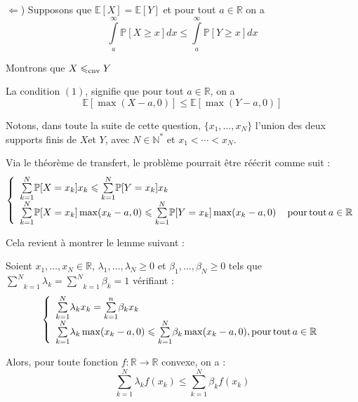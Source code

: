 $\Leftarrow$) Supposons que $\mathbb{E} [X] =\mathbb{E} [Y]$ et pour tout $a
\in \mathbb{R}$ on a
\begin{equation}
  \underset{a}{\overset{\infty}{\int}} \mathbb{P} [X \geqslant x] d x
  \leqslant \underset{a}{\overset{\infty}{\int}} \mathbb{P} [Y \geqslant x] d
  x
\end{equation}


Montrons que $X \leqslant_{\operatorname{cnv}} Y$

La condition $(1)$, signifie que pour tout $a \in \mathbb{R}$, on a
\[ \mathbb{E} [\max (X - a, 0)] \leqslant \mathbb{E} [\max (Y - a, 0)] \]


Notons, dans toute la suite de cette question, $\{ x_1, \ldots, x_N \}$
l'union des deux supports finis de $X$et $Y$, avec $N \in \mathbb{N}^{\ast}$
et $x_1 < \cdots < x_N$.

Via le th{\'e}or{\`e}me de transfert, le probl{\`e}me pourrait {\^e}tre
r{\'e}{\'e}crit comme suit :
\[ \left\{\begin{array}{l}
     \underset{k = 1}{\overset{N}{\sum}} \mathbb{P} [X = x_k] x_k \leqslant
     \underset{k = 1}{\overset{N}{\sum}} \mathbb{P} [Y = x_k] x_k\\
     \underset{k = 1}{\overset{N}{\sum}} \mathbb{P} [X = x_k] \max (x_k - a,
     0) \leqslant \underset{k = 1}{\overset{N}{\sum}} \mathbb{P} [Y = x_k]
     \max (x_k - a, 0) \quad \operatorname{pour} \operatorname{tout} a \in \mathbb{R}
   \end{array}\right. \]


Cela revient {\`a} montrer le lemme suivant :

 Soient $x_1, \ldots, x_N \in \mathbb{R}$, $\lambda_1,
\ldots, \lambda_N \geqslant 0$ et $\beta_1, \ldots, \beta_N \geqslant 0$ tels
que $\underset{k = 1}{\overset{N}{\sum}} \lambda_k = \underset{k =
1}{\overset{N}{\sum}} \beta_k = 1$ v{\'e}rifiant :
\begin{equation}
  \left\{\begin{array}{l}
    \underset{k = 1}{\overset{N}{\sum}} \lambda_k x_k = \underset{k =
    1}{\overset{n}{\sum}} \beta_k x_k\\
    \underset{k = 1}{\overset{N}{\sum}} \lambda_k \max (x_k - a, 0) \leqslant
    \underset{k = 1}{\overset{N}{\sum}} \beta_k \max (x_k - a, 0), \operatorname{pour}
    \operatorname{tout} a \in \mathbb{R}
  \end{array}\right.
\end{equation}


Alors, pour toute fonction $f : \mathbb{R} \rightarrow \mathbb{R}$ convexe, on
a :
\[ \underset{k = 1}{\overset{N}{\sum}} \lambda_k f (x_k) \leqslant \underset{k
   = 1}{\overset{N}{\sum}} \beta_k f (x_k) \]

